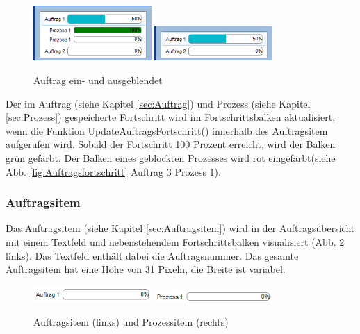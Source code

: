\begin{figure}[htb]
    \centering
    \includegraphics[width=0.4\textwidth]{Abbildungen/AuftragAusgeklappt.png}
    \includegraphics[width=0.4\textwidth]{Abbildungen/AuftragEingeklappt.png}
    \caption{Auftrag ein- und ausgeblendet}		
    \label{fig:Auftragsausblendung}
\end{figure}

Der im Auftrag (siehe Kapitel \ref{sec:Auftrag}) und Prozess (siehe Kapitel \ref{sec:Prozess}) gespeicherte Fortschritt wird im Fortschrittsbalken aktualisiert, wenn die Funktion UpdateAuftragsFortschritt() innerhalb des Auftragsitem aufgerufen wird. Sobald der Fortschritt 100 Prozent erreicht, wird der Balken grün gefärbt. Der Balken eines geblockten Prozesses wird rot eingefärbt(siehe Abb. \ref{fig:Auftragsfortschritt} Auftrag 3 Prozess 1). 

\subsubsection{Auftragsitem}

Das Auftragsitem (siehe Kapitel \ref{sec:Auftragsitem}) wird in der Auftragsübersicht mit einem Textfeld und nebenstehendem Fortschrittsbalken visualisiert (Abb. \ref{fig:Auftragsitem} links). Das Textfeld enthält dabei die Auftragsnummer. Das gesamte Auftragsitem hat eine Höhe von 31 Pixeln, die Breite ist variabel. 

\begin{figure}[htb]
    \centering
    \includegraphics[width=0.4\textwidth]{Abbildungen/Auftragsitem.png}
    \includegraphics[width=0.4\textwidth]{Abbildungen/Prozessitem.png}
    \caption{Auftragsitem (links) und Prozessitem (rechts)}		
    \label{fig:Auftragsitem}
\end{figure}

